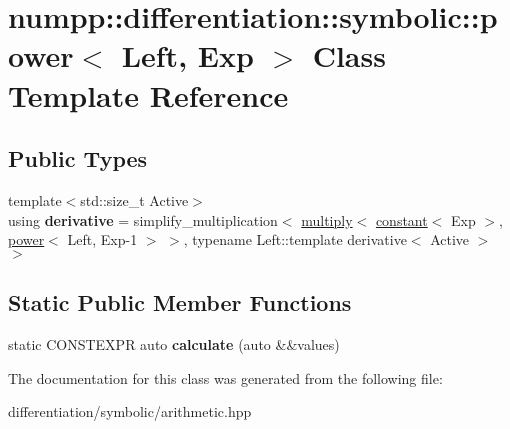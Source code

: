 \hypertarget{classnumpp_1_1differentiation_1_1symbolic_1_1power}{}\section{numpp\+:\+:differentiation\+:\+:symbolic\+:\+:power$<$ Left, Exp $>$ Class Template Reference}
\label{classnumpp_1_1differentiation_1_1symbolic_1_1power}
\subsection*{Public Types}
\begin{DoxyCompactItemize}
\item 
\mbox{\label{classnumpp_1_1differentiation_1_1symbolic_1_1power_aba34fd92a6784601b20d66413423802b}} 
{\footnotesize template$<$std\+::size\+\_\+t Active$>$ }\\using {\bfseries derivative} = simplify\+\_\+multiplication$<$ \hyperlink{classnumpp_1_1differentiation_1_1symbolic_1_1multiply}{multiply}$<$ \hyperlink{classnumpp_1_1differentiation_1_1symbolic_1_1constant}{constant}$<$ Exp $>$, \hyperlink{classnumpp_1_1differentiation_1_1symbolic_1_1power}{power}$<$ Left, Exp-\/1 $>$ $>$, typename Left\+::template derivative$<$ Active $>$ $>$
\end{DoxyCompactItemize}
\subsection*{Static Public Member Functions}
\begin{DoxyCompactItemize}
\item 
\mbox{\label{classnumpp_1_1differentiation_1_1symbolic_1_1power_a02f035c5198288fa0f22c48655574904}} 
static C\+O\+N\+S\+T\+E\+X\+PR auto {\bfseries calculate} (auto \&\&values)
\end{DoxyCompactItemize}


The documentation for this class was generated from the following file\+:\begin{DoxyCompactItemize}
\item 
differentiation/symbolic/arithmetic.\+hpp\end{DoxyCompactItemize}
